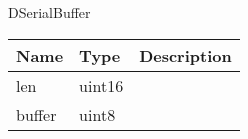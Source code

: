  {DSerialBuffer}
\begin{tabular}[ht]{|l|l|p{8cm}|}
\hline
\textbf{Name} & \textbf{Type} & \textbf{Description}\\
\hline
len & uint16 & \\
\hline
buffer & uint8 & \\
\hline
\end{tabular}


